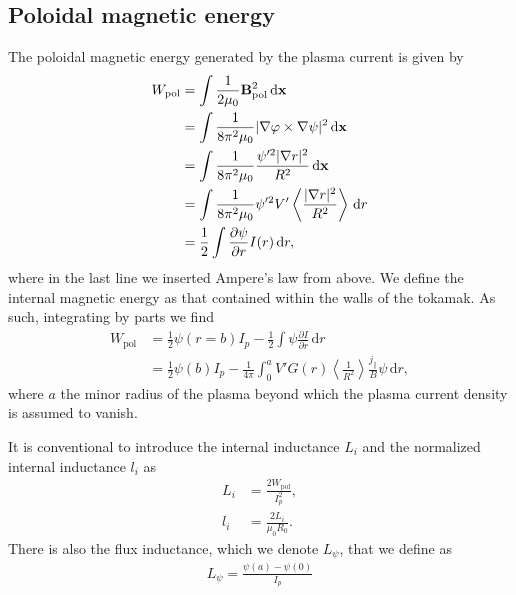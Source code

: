 \documentclass[11pt,a4paper]{article}
\newcommand{\rd}{\ensuremath{\mathrm{d}}}
\newcommand{\sub}[1]{\ensuremath{_{\text{#1}}}}
\renewcommand{\b}[1]{\ensuremath{ {\bf #1 } }}
\begin{document}
\subsection{Poloidal magnetic energy}
The poloidal magnetic energy generated by the plasma current is given by
\begin{align}
W\sub{pol} &= \int  \frac{1}{2\mu_0}\b{B}\sub{pol}^2 \, \rd\b{x}  \nonumber \\
&= \int \frac{1}{8\pi^2\mu_0}| \nabla \varphi \times \nabla \psi |^2 \,\rd\b{x} \nonumber \\
&= \int \frac{1}{8\pi^2\mu_0}\frac{\psi'^2 |\nabla r|^2}{R^2} \,\rd\b{x} \nonumber \\
&= \int  \frac{1}{8\pi^2\mu_0}\psi'^2 V' \left\langle  \frac{|\nabla r|^2}{R^2}  \right\rangle  \, \rd r \nonumber \\
&= \frac{1}{2} \int \frac{\partial \psi}{\partial r} I(r) \, \rd r,
\end{align}
where in the last line we inserted Ampere's law from above. We define the internal magnetic energy as that contained within the walls of the tokamak. As such, integrating by parts we find
\begin{align}
W\sub{pol} &= \frac{1}{2}\psi(r=b) I_p - \frac{1}{2}\int \psi \frac{\partial I}{\partial r} \, \rd r \nonumber \\
&=\frac{1}{2}\psi(b) I_p-\frac{1}{4\pi}\int_0^a V' G(r)\left\langle\frac{1}{R^2}\right\rangle \frac{j_\parallel}{B}\psi \,\rd r,
\end{align}
where $a$ the minor radius of the plasma beyond which the plasma current density is assumed to vanish.

 It is conventional to introduce the internal inductance $L_i$ and the normalized internal inductance $l_i$ as 
\begin{align}
L_i &= \frac{2 W\sub{pol}}{I_p^2}, \nonumber \\
l_i &= \frac{2 L_i}{\mu_0 R_0}.
\end{align}
There is also the flux inductance, which we denote $L_\psi$, that we define as
\begin{align}
L_\psi = \frac{\psi(a) - \psi(0)}{I_p}
\end{align}
\end{document}

